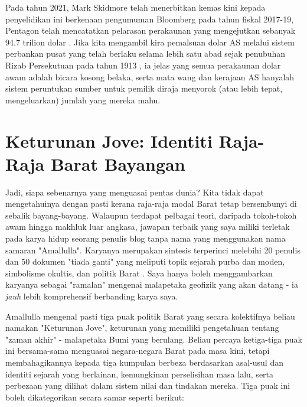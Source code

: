 \documentclass[10pt,twocolumn,letterpaper]{article}
\begin{document}
Pada tahun 2021, Mark Skidmore telah menerbitkan kemas kini kepada penyelidikan ini berkenaan pengumuman Bloomberg pada tahun fiskal 2017-19, Pentagon telah mencatatkan pelarasan perakaunan yang mengejutkan sebanyak 94.7 trilion dolar \cite{17,18}. Jika kita mengambil kira pemalsuan dolar AS melalui sistem perbankan pusat yang telah berlaku selama lebih satu abad sejak penubuhan Rizab Persekutuan pada tahun 1913 \cite{37}, ia jelas yang semua perakaunan dolar awam adalah bicara kosong belaka, serta mata wang dan kerajaan AS hanyalah sistem peruntukan sumber untuk pemilik diraja menyorok (atau lebih tepat, mengeluarkan) jumlah yang mereka mahu.
\section{Keturunan Jove: Identiti Raja-Raja Barat Bayangan}

Jadi, siapa sebenarnya yang menguasai pentas dunia? Kita tidak dapat mengetahuinya dengan pasti kerana raja-raja modal Barat tetap bersembunyi di sebalik bayang-bayang. Walaupun terdapat pelbagai teori, daripada tokoh-tokoh awam hingga makhluk luar angkasa, jawapan terbaik yang saya miliki terletak pada karya hidup seorang penulis blog tanpa nama yang menggunakan nama samaran "Amallulla". Karyanya merupakan sintesis terperinci melebihi 20 penulis dan 50 dokumen "tiada ganti" yang meliputi topik sejarah purba dan moden, simbolisme okultis, dan politik Barat \cite{33,34}. Saya hanya boleh menggambarkan karyanya sebagai "ramalan" mengenai malapetaka geofizik yang akan datang - ia \textit{jauh} lebih komprehensif berbanding karya saya.

Amallulla mengenal pasti tiga puak politik Barat yang secara kolektifnya beliau namakan "Keturunan Jove", keturunan yang memiliki pengetahuan tentang "zaman akhir" - malapetaka Bumi yang berulang. Beliau percaya ketiga-tiga puak ini bersama-sama menguasai negara-negara Barat pada masa kini, tetapi membahagikannya kepada tiga kumpulan berbeza berdasarkan asal-usul dan identiti sejarah yang berlainan, kemungkinan perselisihan masa lalu, serta perbezaan yang dilihat dalam sistem nilai dan tindakan mereka.
Tiga puak ini boleh dikategorikan secara samar seperti berikut:
\end{document}
